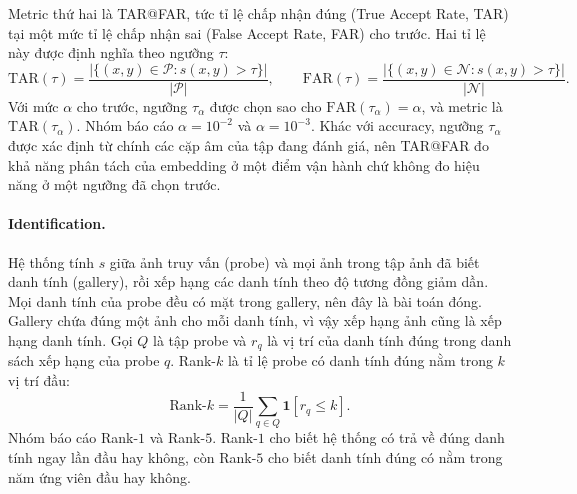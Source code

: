 \documentclass[a4paper,12pt]{article}
\begin{document}
Metric thứ hai là TAR@FAR, tức tỉ lệ chấp nhận đúng (True Accept Rate, TAR) tại một mức tỉ lệ chấp nhận sai (False Accept Rate, FAR) cho trước. Hai tỉ lệ này được định nghĩa theo ngưỡng $\tau$:
\begin{equation}
    \mathrm{TAR}(\tau) = \frac{\bigl|\{(x,y)\in\mathcal{P} : s(x,y) > \tau\}\bigr|}{|\mathcal{P}|}, \qquad
    \mathrm{FAR}(\tau) = \frac{\bigl|\{(x,y)\in\mathcal{N} : s(x,y) > \tau\}\bigr|}{|\mathcal{N}|}.
\end{equation}
Với mức $\alpha$ cho trước, ngưỡng $\tau_\alpha$ được chọn sao cho $\mathrm{FAR}(\tau_\alpha) = \alpha$, và metric là $\mathrm{TAR}(\tau_\alpha)$. Nhóm báo cáo $\alpha = 10^{-2}$ và $\alpha = 10^{-3}$. Khác với accuracy, ngưỡng $\tau_\alpha$ được xác định từ chính các cặp âm của tập đang đánh giá, nên TAR@FAR đo khả năng phân tách của embedding ở một điểm vận hành chứ không đo hiệu năng ở một ngưỡng đã chọn trước.

\paragraph{Identification.} Hệ thống tính $s$ giữa ảnh truy vấn (probe) và mọi ảnh trong tập ảnh đã biết danh tính (gallery), rồi xếp hạng các danh tính theo độ tương đồng giảm dần. Mọi danh tính của probe đều có mặt trong gallery, nên đây là bài toán đóng. Gallery chứa đúng một ảnh cho mỗi danh tính, vì vậy xếp hạng ảnh cũng là xếp hạng danh tính. Gọi $Q$ là tập probe và $r_q$ là vị trí của danh tính đúng trong danh sách xếp hạng của probe $q$. Rank-$k$ là tỉ lệ probe có danh tính đúng nằm trong $k$ vị trí đầu:
\begin{equation}
    \text{Rank-}k = \frac{1}{|Q|}\sum_{q\in Q} \mathbf{1}\left[r_q \le k\right].
\end{equation}
Nhóm báo cáo Rank-$1$ và Rank-$5$. Rank-$1$ cho biết hệ thống có trả về đúng danh tính ngay lần đầu hay không, còn Rank-$5$ cho biết danh tính đúng có nằm trong năm ứng viên đầu hay không.
\end{document}
